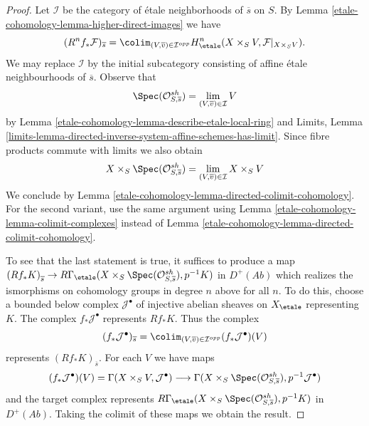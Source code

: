 \begin{proof}
Let $\mathcal{I}$ be the category of \'etale neighborhoods of $\overline{s}$
on $S$. By Lemma \ref{etale-cohomology-lemma-higher-direct-images}
we have
$$
(R^nf_*\mathcal{F})_{\overline{s}} =
\colim_{(V, \overline{v}) \in \mathcal{I}^{opp}}
H_\etale^n(X \times_S V, \mathcal{F}|_{X \times_S V}).
$$
We may replace $\mathcal{I}$ by the initial subcategory consisting
of affine \'etale neighbourhoods of $\overline{s}$. Observe that
$$
\Spec(\mathcal{O}_{S, \overline{s}}^{sh}) =
\lim_{(V, \overline{v}) \in \mathcal{I}} V
$$
by Lemma \ref{etale-cohomology-lemma-describe-etale-local-ring} and
Limits, Lemma
\ref{limits-lemma-directed-inverse-system-affine-schemes-has-limit}.
Since fibre products commute with limits we also obtain
$$
X \times_S \Spec(\mathcal{O}_{S, \overline{s}}^{sh}) =
\lim_{(V, \overline{v}) \in \mathcal{I}} X \times_S V
$$
We conclude by Lemma \ref{etale-cohomology-lemma-directed-colimit-cohomology}.
For the second variant, use the same argument using
Lemma \ref{etale-cohomology-lemma-colimit-complexes} instead of
Lemma \ref{etale-cohomology-lemma-directed-colimit-cohomology}.

\medskip\noindent
To see that the last statement is true, it suffices to produce a map
$\left(Rf_*K\right)_{\overline{s}} \to
R\Gamma_\etale(X \times_S \Spec(\mathcal{O}_{S, \overline{s}}^{sh}), p^{-1}K)$
in $D^+(\textit{Ab})$ which realizes the ismorphisms on cohomology
groups in degree $n$ above for all $n$. To do this, choose a
bounded below complex $\mathcal{J}^\bullet$ of injective abelian
sheaves on $X_\etale$ representing $K$. The complex
$f_*\mathcal{J}^\bullet$ represents $Rf_*K$. Thus the complex
$$
(f_*\mathcal{J}^\bullet)_{\overline{s}} =
\colim_{(V, \overline{v}) \in \mathcal{I}^{opp}}
(f_*\mathcal{J}^\bullet)(V)
$$
represents $(Rf_*K)_{\overline{s}}$. For each $V$ we have maps
$$
(f_*\mathcal{J}^\bullet)(V) =
\Gamma(X \times_S V, \mathcal{J}^\bullet)
\longrightarrow
\Gamma(X \times_S \Spec(\mathcal{O}_{S, \overline{s}}^{sh}),
p^{-1}\mathcal{J}^\bullet)
$$
and the target complex represents
$R\Gamma_\etale(X \times_S \Spec(\mathcal{O}_{S, \overline{s}}^{sh}), p^{-1}K)$
in $D^+(\textit{Ab})$.
Taking the colimit of these maps we obtain the result.
\end{proof}

